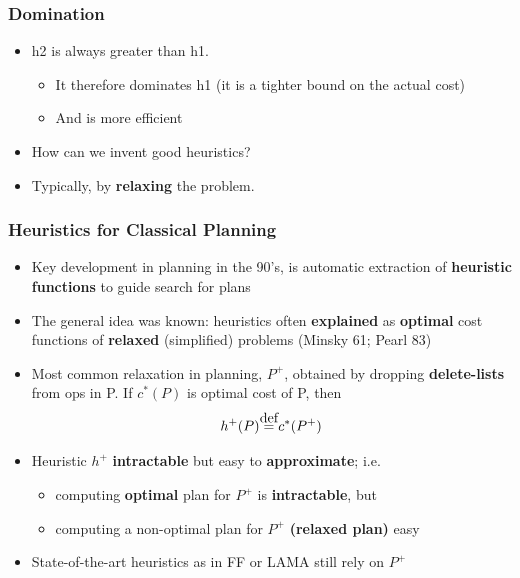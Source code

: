 \documentclass{beamer}
\newcommand\myeq{\stackrel{\mathclap{\normalfont\mbox{def}}}{=}}
\begin{document}
	\begin{frame}[c]\frametitle{Domination}
		\begin{itemize}
			\item h2 is always greater than h1. 
			\begin{itemize}
				\item It therefore dominates h1 (it is a tighter bound on the actual cost)
				\item And is more efficient
			\end{itemize}
			\item How can we invent good heuristics?
			\item Typically, by \textbf{relaxing} the problem.
		\end{itemize}
	\end{frame}

	\begin{frame}[c]\frametitle{Heuristics for Classical Planning}
		\begin{itemize}
			\item Key development in planning in the 90’s, is automatic extraction of \textbf{heuristic functions} to guide search for plans 
			\item The general idea was known: heuristics often \textbf{explained} as \textbf{optimal} cost functions of \textbf{relaxed} (simplified) problems (Minsky 61; Pearl 83)
			\item Most common relaxation in planning, $P^+$, obtained by dropping \textbf{delete-lists} from ops in P. If $c^*(P)$ is optimal cost of P, then
			$$h^{+}(P) \myeq c^{*}(P^{+})$$
			\item Heuristic $h^{+}$ \textbf{intractable} but easy to \textbf{approximate}; i.e. 
			\begin{itemize}
				\item computing \textbf{optimal} plan for $P^{+}$ is \textbf{intractable}, but 
				\item computing a non-optimal plan for $P^{+}$ \textbf{(relaxed plan)} easy 
			\end{itemize}
			\item State-of-the-art heuristics as in FF or LAMA still rely on $P^{+}$
		\end{itemize}
	\end{frame}
	
\end{document}
